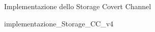 \begin{frame} 
\vfill
\begin{center}
{\huge Implementazione dello Storage Covert Channel}
\end{center}
\vfill 
\end{frame}

{implementazione_Storage_CC_v4} 

